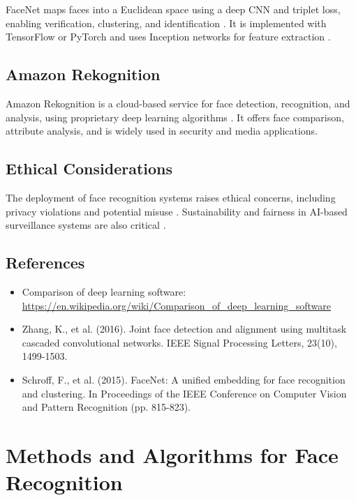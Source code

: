 FaceNet maps faces into a Euclidean space using a deep CNN and triplet loss, enabling verification, clustering, and identification \cite{schroff2015facenet}. It is implemented with TensorFlow or PyTorch and uses Inception networks for feature extraction \cite{tensorflow}.

\subsection{Amazon Rekognition}

Amazon Rekognition is a cloud-based service for face detection, recognition, and analysis, using proprietary deep learning algorithms \cite{rekognition}. It offers face comparison, attribute analysis, and is widely used in security and media applications.

\subsection{Ethical Considerations}

The deployment of face recognition systems raises ethical concerns, including privacy violations and potential misuse \cite{ergun_2025_ethical}. Sustainability and fairness in AI-based surveillance systems are also critical \cite{sustainability_2025_ethical}.

\subsection{References}
\begin{itemize}
    \item Comparison of deep learning software: \url{https://en.wikipedia.org/wiki/Comparison_of_deep_learning_software}
    \item Zhang, K., et al. (2016). Joint face detection and alignment using multitask cascaded convolutional networks. IEEE Signal Processing Letters, 23(10), 1499-1503.
    \item Schroff, F., et al. (2015). FaceNet: A unified embedding for face recognition and clustering. In Proceedings of the IEEE Conference on Computer Vision and Pattern Recognition (pp. 815-823).
\end{itemize}

\section{Methods and Algorithms for Face Recognition}

